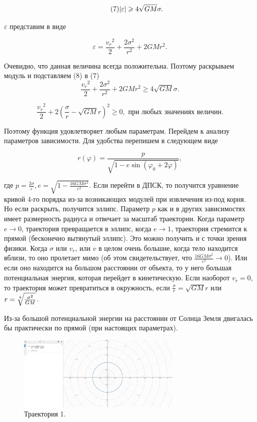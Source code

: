 \documentclass[a4paper]{article}
\begin{document}
\begin{equation} \tag{7}
\abs{\varepsilon}  \geqslant 4\sqrt{GM}\sigma.
\end{equation}

$\varepsilon$ представим в виде

\begin{equation} \tag{8}
\varepsilon =  \frac{{v_r}^2} {2} + \frac{2\sigma^2}{r^2} + 2GMr^2.
\end{equation}

Очевидно, что данная величина всегда положительна. Поэтому раскрываем модуль и подставляем (8) в (7)
\[
\frac{{v_r}^2} {2} + \frac{2\sigma^2}{r^2} + 2GMr^2  \geqslant 4\sqrt{GM}\sigma.
\]

\[
\frac{{v_r}^2} {2} + 2(\frac{\sigma} {r} - \sqrt{GM}r)^2  \geqslant 0 , \text{ при любых значениях величин}.
\]

Поэтому функция удовлетворяет любым параметрам.
Перейдем к анализу параметров зависимости. Для удобства перепишем в следующем виде

\[
r(\varphi) = \frac{p}{\sqrt{1-e\sin{(\varphi_0 + 2\varphi)}}},
\]

где $p = \frac{2\sigma}{\varepsilon}, e = \sqrt{1-\frac{16GM\sigma^2}{\varepsilon^2}}$. Если перейти в ДПСК, то получится уравнение кривой 4-го порядка из-за возникающих модулей при извлечения из-под корня. Но если раскрыть, получится эллипс. Параметр $p$ как и в других зависимостях имеет размерность радиуса и отвечает за масштаб траектории. Когда параметр $e \longrightarrow 0$, траектория превращается в эллипс, когда $e \longrightarrow 1$, траектория стремится к прямой (бесконечно вытянутый эллипс). Это можно получить и с точки зрения физики. Когда $\sigma$ или $v_r$, или $v$ в целом очень большие, когда тело находится вблизи, то оно пролетает мимо (об этом свидетельствует, что $\frac{16GM\sigma^2}{\varepsilon^2} \longrightarrow 0$). Или если оно находится на большом расстоянии от объекта, то у него большая потенциальная энергия, которая перейдет в кинетическую. Если наоборот $v_r = 0$, то траектория может превратиться в окружность, если $\frac{\sigma}{r} = \sqrt{GM}r$ или $r = \sqrt[\leftroot{0}\uproot{1}4]{\frac{\sigma^2}{GM}}$.

Из-за большой потенциальной энергии на расстоянии от Солнца Земля двигалась бы практически по прямой (при настоящих параметрах).

\begin{figure}[h]
    \centering
    \includegraphics[width=0.7\textwidth]{Graphic3_1.jpg}
    \caption{Траектория 1.}
\end{figure}
\end{document}
